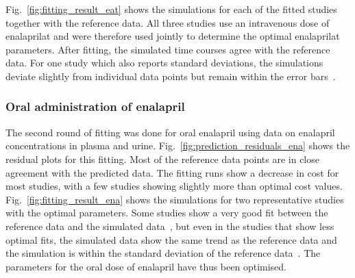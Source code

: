 \documentclass[pharmaceutics,article,submit,pdftex,moreauthors]{Definitions/mdpi}
\begin{document}
Fig.~\ref{fig:fitting_result_eat} shows the simulations for each of the fitted studies together with the reference data. All three studies use an intravenous dose of enalaprilat and were therefore used jointly to determine the optimal enalaprilat parameters. After fitting, the simulated time courses agree with the reference data. For one study which also reports standard deviations, the simulations deviate slightly from individual data points but remain within the error bars~\cite{Mujais1992}.

\subsubsection{Oral administration of enalapril}


The second round of fitting was done for oral enalapril using data on enalapril concentrations in plasma and urine. Fig.~\ref{fig:prediction_residuals_ena} shows the residual plots for this fitting. Most of the reference data points are in close agreement with the predicted data. The fitting runs show a decrease in cost for most studies, with a few studies showing slightly more than optimal cost values. Fig.~\ref{fig:fitting_result_ena} shows the simulations for two representative studies with the optimal parameters. Some studies show a very good fit between the reference data and the simulated data~\cite{Oguchi1993}, but even in the studies that show less optimal fits, the simulated data show the same trend as the reference data and the simulation is within the standard deviation of the reference data~\cite{Biollaz1982}. The parameters for the oral dose of enalapril have thus been optimised. 

\end{document}
